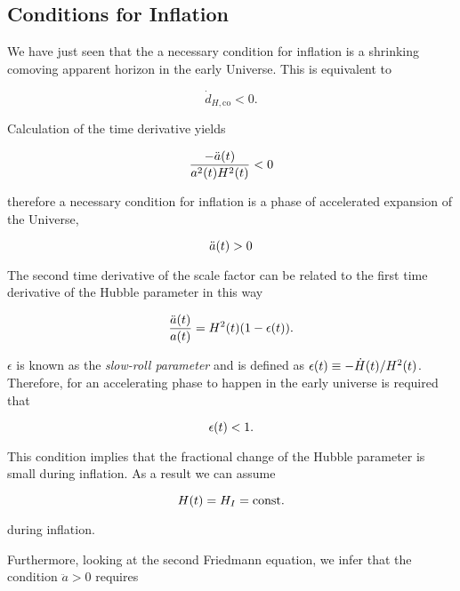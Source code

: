 \subsection{Conditions for Inflation}

We have just seen that the a necessary condition for inflation is a
shrinking comoving apparent horizon in the early Universe. This is
equivalent to

\begin{equation}
        \dot d_{H,\text{co}} < 0.
\end{equation}

Calculation of the time derivative yields

\begin{equation}
        \frac{-\ddot a\qty(t)}{a^2\qty(t) H^2\qty(t)} < 0
\end{equation}

therefore a necessary condition for inflation is a phase of accelerated
expansion of the Universe,

\begin{equation}
        \ddot a\qty(t) > 0
\end{equation}

The second time derivative of the scale factor can be related to the first
time derivative of the Hubble parameter in this way

\begin{equation}
        \frac{\ddot a\qty(t)}{a\qty(t)} = H^2\qty(t)\qty(1 - \epsilon\qty(t)).
\end{equation}

$\epsilon$ is known as the \emph{slow-roll parameter} and is defined as
$\epsilon\qty(t) \equiv -\dot H\qty(t)/H^2\qty(t)$.
Therefore, for an accelerating phase to happen in the early universe is
required that

\begin{equation}
        \epsilon\qty(t) < 1.
\end{equation}

This condition implies that the fractional change of the Hubble parameter
is small during inflation. As a result we can assume

\begin{equation}
        H\qty(t) = H_I = \text{const.}
\end{equation}

during inflation.

Furthermore, looking at the second Friedmann equation, we infer that the condition $\ddot
a > 0$ requires

